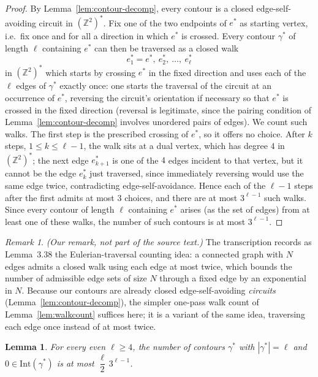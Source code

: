 \documentclass[11pt]{article}
\theoremstyle{plain}
\newtheorem{lemma}[theorem]{Lemma}
\theoremstyle{definition}
\theoremstyle{remark}
\newtheorem{remark}[theorem]{Remark}
\newcommand{\Z}{\mathbb{Z}}
\newcommand{\dualZ}{(\Z^2)^*}       %
\newcommand{\Intr}{\mathrm{Int}}    %
\begin{document}
\begin{proof}
By Lemma~\ref{lem:contour-decomp}, every contour is a closed
edge-self-avoiding circuit in $\dualZ$. Fix one of the two endpoints of $e^*$
as starting vertex, i.e.\ fix once and for all a direction in which $e^*$ is
crossed. Every contour $\gamma^*$ of length $\ell$ containing $e^*$ can then
be traversed as a closed walk
\[
  e^*_1=e^*,\ e^*_2,\ \dots,\ e^*_\ell
\]
in $\dualZ$ which starts by crossing $e^*$ in the fixed direction and uses
each of the $\ell$ edges of $\gamma^*$ exactly once: one starts the
traversal of the circuit at an occurrence of $e^*$, reversing the circuit's
orientation if necessary so that $e^*$ is crossed in the fixed direction
(reversal is legitimate, since the pairing condition of
Lemma~\ref{lem:contour-decomp} involves unordered pairs of edges). We count
such walks. The first step
is the prescribed crossing of $e^*$, so it offers no choice. After
$k$ steps, $1\le k\le\ell-1$, the walk sits at a dual vertex, which has degree
$4$ in $\dualZ$; the next edge $e^*_{k+1}$ is one of the $4$ edges incident
to that vertex, but it cannot be the edge $e^*_k$ just traversed, since
immediately reversing would use the same edge twice, contradicting
edge-self-avoidance. Hence each of the $\ell-1$ steps after the first admits
at most $3$ choices, and there are at most $3^{\ell-1}$ such walks. Since
every contour of length $\ell$ containing $e^*$ arises (as the set of edges)
from at least one of these walks, the number of such contours is at most
$3^{\ell-1}$.
\end{proof}

\begin{remark}
\emph{(Our remark, not part of the source text.)} The transcription records
as Lemma~3.38 the Eulerian-traversal counting idea: a connected graph with
$N$ edges admits a closed walk using each edge at most twice, which bounds
the number of admissible edge sets of size $N$ through a fixed edge by an
exponential in $N$. Because our contours are already closed
edge-self-avoiding \emph{circuits} (Lemma~\ref{lem:contour-decomp}), the
simpler one-pass walk count of Lemma~\ref{lem:walkcount} suffices here; it is
a variant of the same idea, traversing each edge once instead of at most
twice.
\end{remark}

\begin{lemma}
\label{lem:counting}
For every even $\ell\ge4$, the number of contours $\gamma^*$ with
$|\gamma^*|=\ell$ and $0\in\Intr(\gamma^*)$ is at most
$\dfrac{\ell}{2}\,3^{\ell-1}$.
\end{lemma}
\end{document}
